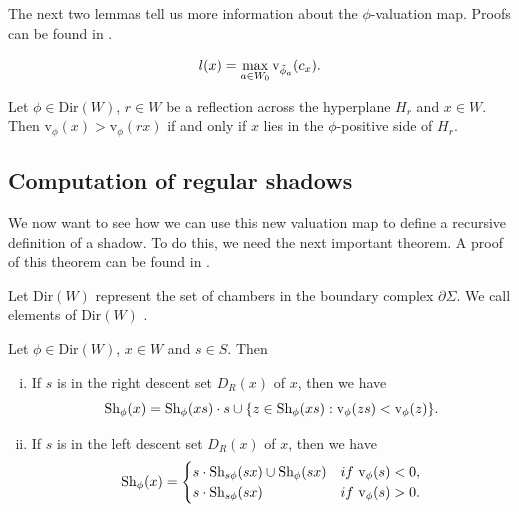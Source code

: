\documentclass[11pt]{article}
\begin{document}
The next two lemmas tell us more information about the $\phi$-valuation map. Proofs can be found in \cite{SHA}.

\begin{lemma}
    \[l(x)=\max_{a\in W_0}\textnormal{v}_{\tilde{\phi}_a}(c_x).\]
\end{lemma}


\begin{lemma}
    Let $\phi\in$Dir$(W)$, $r\in W$ be a reflection across the hyperplane $H_r$ and $x\in W$. Then v$_\phi(x)>$v$_\phi(rx)$ if and only if $x$ lies in the $\phi$-positive side of $H_r$. 
\end{lemma}


\subsection{Computation of regular shadows}

We now want to see how we can use this new valuation map to define a recursive definition of a shadow. To do this, we need the next important theorem. A proof of this theorem can be found in \cite[pp.142-143]{SHA}. 

Let Dir$(W)$ represent the set of chambers in the boundary complex $\partial\Sigma$. We call elements of Dir$(W)$ . 

\begin{theorem}
    Let $\phi\in$Dir$(W)$, $x\in W$ and $s\in S$. Then
    \begin{enumerate}[(i)]
        \item If $s$ is in the right descent set $D_R(x)$ of $x$, then we have
        \[\textnormal{Sh}_\phi(x)=\textnormal{Sh}_\phi(xs)\cdot s \cup \{z\in \textnormal{Sh}_\phi(xs):\textnormal{v}_\phi(zs)<\textnormal{v}_\phi(z)\}.\]
        \item If $s$ is in the left descent set $D_R(x)$ of $x$, then we have
        \[\textnormal{Sh}_\phi(x)=\begin{cases}
            s\cdot \textnormal{Sh}_{s\phi}(sx)\cup \textnormal{Sh}_\phi(sx) &if\textnormal{ v}_\phi(s)<0,\\
            s\cdot \textnormal{Sh}_{s\phi}(sx) &if \textnormal{ v}_\phi(s)>0.\\
        \end{cases}\]
    \end{enumerate}
\end{theorem}


\end{document}
